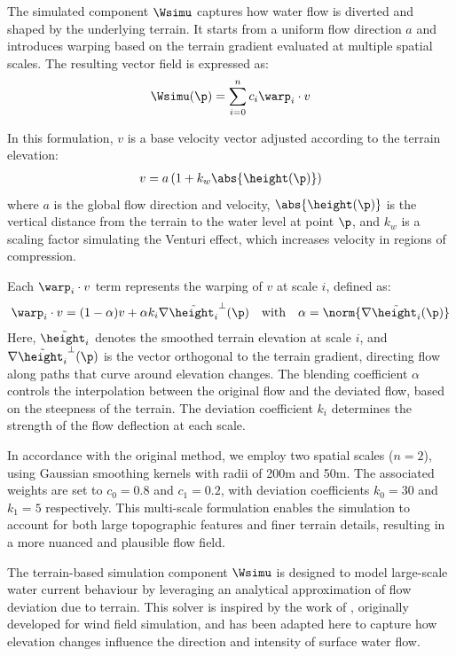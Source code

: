 The simulated component $\Wsimu$ captures how water flow is diverted and shaped by the underlying terrain. It starts from a uniform flow direction $a$ and introduces warping based on the terrain gradient evaluated at multiple spatial scales. The resulting vector field is expressed as:
\begin{align}
\Wsimu(\p) = \sum_{i=0}^{n}{c_i \warp_i \cdot v}
\end{align}

In this formulation, $v$ is a base velocity vector adjusted according to the terrain elevation:
\begin{align}
v = a \left(1 + k_w \abs{\height(\p)} \right)
\end{align}
where $a$ is the global flow direction and velocity, $\abs{\height(\p)}$ is the vertical distance from the terrain to the water level at point $\p$, and $k_w$ is a scaling factor simulating the Venturi effect, which increases velocity in regions of compression.

Each $\warp_i \cdot v$ term represents the warping of $v$ at scale $i$, defined as:
\begin{align}
\warp_i \cdot v = (1 - \alpha) v + \alpha k_i \nabla \Tilde{\height_i}^{\perp}(\p) \quad \text{with} \quad \alpha = \norm{ \nabla \Tilde{\height_i}(\p) }
\end{align}
Here, $\Tilde{\height_i}$ denotes the smoothed terrain elevation at scale $i$, and $\nabla \Tilde{\height_i}^{\perp}(\p)$ is the vector orthogonal to the terrain gradient, directing flow along paths that curve around elevation changes. The blending coefficient $\alpha$ controls the interpolation between the original flow and the deviated flow, based on the steepness of the terrain. The deviation coefficient $k_i$ determines the strength of the flow deflection at each scale.

In accordance with the original method, we employ two spatial scales ($n = 2$), using Gaussian smoothing kernels with radii of 200m and 50m. The associated weights are set to $c_0 = 0.8$ and $c_1 = 0.2$, with deviation coefficients $k_0 = 30$ and $k_1 = 5$ respectively. This multi-scale formulation enables the simulation to account for both large topographic features and finer terrain details, resulting in a more nuanced and plausible flow field.

The terrain-based simulation component $\Wsimu$ is designed to model large-scale water current behaviour by leveraging an analytical approximation of flow deviation due to terrain. This solver is inspired by the work of \cite{Paris2019b}, originally developed for wind field simulation, and has been adapted here to capture how elevation changes influence the direction and intensity of surface water flow.

